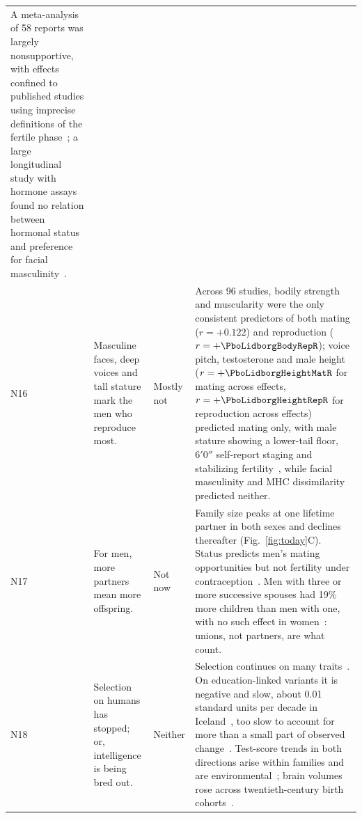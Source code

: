 \begin{table}[t]
\begin{tabularx}{\textwidth}{@{}P{0.028\textwidth}P{0.20\textwidth}P{0.10\textwidth}L@{}}
A meta-analysis of 58 reports was largely nonsupportive, with effects confined to published studies using imprecise
definitions of the fertile phase~\cite{wood2014}; a large longitudinal study with hormone assays found no relation between
hormonal status and preference for facial masculinity~\cite{jones2018}.\\
\addlinespace
N16 & Masculine faces, deep voices and tall stature mark the men who reproduce most. & Mostly not &
Across 96 studies, bodily strength and muscularity were the only consistent predictors of both mating ($r=+0.122$) and reproduction ($r=+\PboLidborgBodyRepR$); voice
pitch, testosterone and male height ($r=+\PboLidborgHeightMatR$ for mating across \PboLidborgHeightMatK{} effects, $r=+\PboLidborgHeightRepR$ for reproduction across \PboLidborgHeightRepK{} effects) predicted mating only, with male stature showing a lower-tail floor, $6'0''$ self-report staging and stabilizing fertility~\cite{lidborg2022,stulp2012,whyte2021}, while facial masculinity and MHC dissimilarity~\cite{havlicek2020,winternitz2017} predicted neither.\\
\addlinespace
N17 & For men, more partners mean more offspring. & Not now &
Family size peaks at one lifetime partner in both sexes and declines thereafter (Fig.~\ref{fig:today}C). Status predicts men's
mating opportunities but not fertility under contraception~\cite{perusse1993}. Men with three or more successive spouses had 19\%
more children than men with one, with no such effect in women~\cite{jokela2010}: unions, not partners, are what count.\\
\addlinespace
N18 & Selection on humans has stopped; or, intelligence is being bred out. & Neither &
Selection continues on many traits~\cite{byars2010,sanjak2018,gardner2022,akbari2026}. On education-linked variants it is negative
and slow, about 0.01 standard units per decade in Iceland~\cite{kong2017}, too slow to account for more than a small part of
observed change~\cite{beauchamp2016}. Test-score trends in both directions arise within families and are
environmental~\cite{bratsberg2018}; brain volumes rose across twentieth-century birth cohorts~\cite{decarli2024}.\\
\bottomrule
\end{tabularx}
\end{table}
